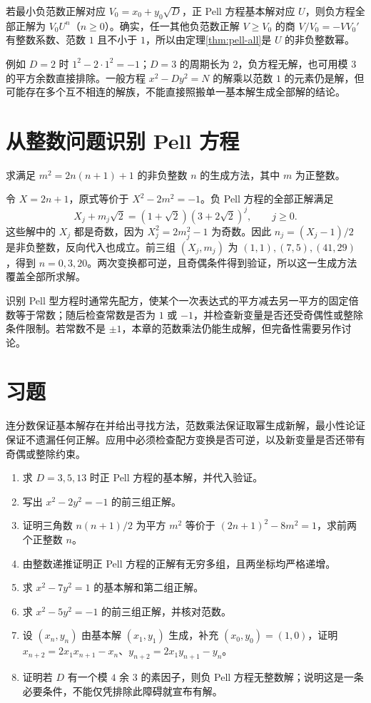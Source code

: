 若最小负范数正解对应 $V_0=x_0+y_0\sqrt D$，正 Pell 方程基本解对应 $U$，则负方程全部正解为 $V_0U^n$（$n\ge0$）。确实，任一其他负范数正解 $V\ge V_0$ 的商 $V/V_0=-VV_0'$ 有整数系数、范数 $1$ 且不小于 $1$，所以由定理\ref{thm:pell-all}是 $U$ 的非负整数幂。

例如 $D=2$ 时 $1^2-2\cdot1^2=-1$；$D=3$ 的周期长为 $2$，负方程无解，也可用模 $3$ 的平方余数直接排除。一般方程 $x^2-Dy^2=N$ 的解乘以范数 $1$ 的元素仍是解，但可能存在多个互不相连的解族，不能直接照搬单一基本解生成全部解的结论。

\section{从整数问题识别 Pell 方程}

\begin{example}[相邻整数的平方关系]
求满足 $m^2=2n(n+1)+1$ 的非负整数 $n$ 的生成方法，其中 $m$ 为正整数。
\end{example}
\begin{solve}
令 $X=2n+1$，原式等价于 $X^2-2m^2=-1$。负 Pell 方程的全部正解满足
\[
 X_j+m_j\sqrt2=(1+\sqrt2)(3+2\sqrt2)^j,\qquad j\ge0.
\]
这些解中的 $X_j$ 都是奇数，因为 $X_j^2=2m_j^2-1$ 为奇数。因此 $n_j=(X_j-1)/2$ 是非负整数，反向代入也成立。前三组 $(X_j,m_j)$ 为 $(1,1),(7,5),(41,29)$，得到 $n=0,3,20$。两次变换都可逆，且奇偶条件得到验证，所以这一生成方法覆盖全部所求解。
\end{solve}

识别 Pell 型方程时通常先配方，使某个一次表达式的平方减去另一平方的固定倍数等于常数；随后检查常数是否为 $1$ 或 $-1$，并检查新变量是否还受奇偶性或整除条件限制。若常数不是 $\pm1$，本章的范数乘法仍能生成解，但完备性需要另作讨论。

\section{习题}

连分数保证基本解存在并给出寻找方法，范数乘法保证取幂生成新解，最小性论证保证不遗漏任何正解。应用中必须检查配方变换是否可逆，以及新变量是否还带有奇偶或整除约束。

\begin{enumerate}
 \item 求 $D=3,5,13$ 时正 Pell 方程的基本解，并代入验证。
 \item 写出 $x^2-2y^2=-1$ 的前三组正解。
 \item 证明三角数 $n(n+1)/2$ 为平方 $m^2$ 等价于 $(2n+1)^2-8m^2=1$，求前两个正整数 $n$。
 \item 由整数递推证明正 Pell 方程的正解有无穷多组，且两坐标均严格递增。
 \item\label{ex:pell-seven} 求 $x^2-7y^2=1$ 的基本解和第二组正解。
 \item\label{ex:pell-negative-five} 求 $x^2-5y^2=-1$ 的前三组正解，并核对范数。
 \item\label{ex:pell-second-order} 设 $(x_n,y_n)$ 由基本解 $(x_1,y_1)$ 生成，补充 $(x_0,y_0)=(1,0)$，证明 $x_{n+2}=2x_1x_{n+1}-x_n$、$y_{n+2}=2x_1y_{n+1}-y_n$。
 \item\label{ex:pell-obstruction} 证明若 $D$ 有一个模 $4$ 余 $3$ 的素因子，则负 Pell 方程无整数解；说明这是一条必要条件，不能仅凭排除此障碍就宣布有解。
\end{enumerate}

